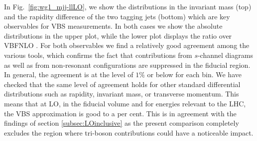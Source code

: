 In Fig.~\ref{fig:wg1_mjj-llLO}, we show the distributions in the invariant mass (top) and the rapidity difference of the two tagging jets (bottom) which are key observables for VBS measurements.
In both cases we show the absolute distributions in the upper plot, while the lower plot displays the ratio over {\sc VBFNLO} .
For both observables we find a relatively good agreement among the various tools, which confirms the fact that contributions from $s$-channel diagrams as well as from non-resonant configurations are suppressed in the fiducial region.
In general, the agreement is at the level of $1\%$ or below for each bin.
We have checked that the same level of agreement holds for other standard differential distributions such as rapidity, invariant mass, or transverse momentum.
This means that at LO, in the fiducial volume and for energies relevant to the LHC, the VBS approximation is good to a per cent.
This is in agreement with the findings of section \ref{subsec:LOinclusive} as the present comparison completely excludes the region where tri-boson contributions could have a noticeable impact.

